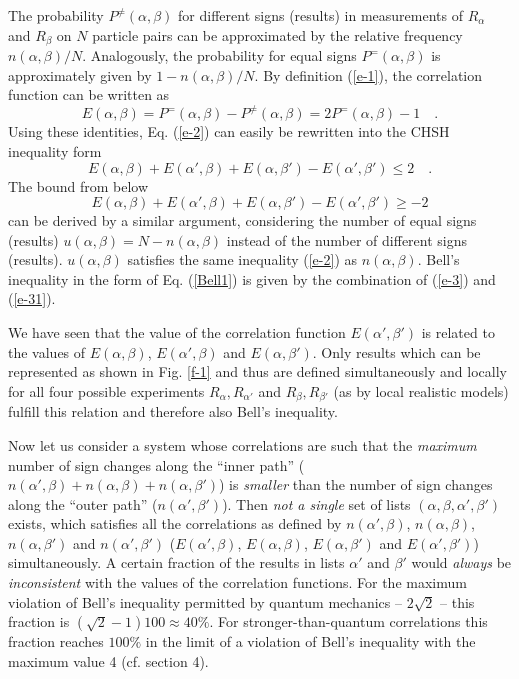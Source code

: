 The probability $P^{\neq} (\alpha , \beta )$ for different signs (results)
in measurements of $R_{\alpha}$ and $R_{\beta}$ on
$N$ particle pairs can be approximated by the relative frequency
$n(\alpha ,\beta)/N$.
Analogously, the probability for equal signs $P^=(\alpha , \beta )$
is approximately given by $1 - n(\alpha ,\beta)/N$.
By definition (\ref{e-1}), the correlation function can be written as
\begin{equation}
E(\alpha ,\beta )=
P^=(\alpha , \beta )-P^{\neq } (\alpha ,\beta )=2P^=(\alpha ,\beta
)-1 \quad.
\label{e-1a}
\end{equation}
Using these identities, Eq. (\ref{e-2}) can easily be rewritten into
the CHSH inequality \cite{chsh} form
\begin{equation}
E(\alpha ,\beta )+
E(\alpha ',\beta )+
E(\alpha ,\beta ') -
E(\alpha ',\beta ')\le 2\quad .
\label{e-3}
\end{equation}
The bound from below
\begin{equation}
E(\alpha ,\beta )+
E(\alpha ',\beta )+
E(\alpha ,\beta ') -
E(\alpha ',\beta ')\ge -2
\label{e-31}
\end{equation}
can be derived by a similar argument, considering
the number of equal signs (results) $u(\alpha ,\beta )= N-n(\alpha,\beta )$
instead of the number of different signs (results).
$u(\alpha ,\beta)$ satisfies the same inequality
(\ref{e-2}) as $n(\alpha ,\beta )$. Bell's inequality in the form of
Eq. (\ref{Bell1}) is given by the combination of (\ref{e-3}) and
(\ref{e-31}).

We have seen that the value of the correlation function
$E(\alpha ',\beta ')$ is related to the values of
$E(\alpha ,\beta )$,
$E(\alpha ',\beta )$ and
$E(\alpha ,\beta ')$.
Only results which can be represented as shown in Fig. \ref{f-1}
and thus are defined simultaneously and locally for all four
possible experiments $R_{\alpha},R_{\alpha '}$ and $R_{\beta},R_{\beta '}$
(as by local realistic models)
fulfill this relation and therefore also Bell's inequality.

Now let us consider a system whose correlations are such
that the {\em maximum} number of sign
changes along the ``inner path'' ($n(\alpha ',\beta )+
n(\alpha ,\beta )+
n(\alpha ,\beta ')$)
is {\em smaller} than the number of sign changes
along the ``outer path'' ($n(\alpha ',\beta ')$).
Then {\em not a single} set of lists
$(\alpha, \beta, \alpha ', \beta ')$ exists,
which satisfies all the correlations as defined by
$n(\alpha ',\beta)$, $n(\alpha ,\beta )$, $n(\alpha ,\beta ')$ and
$n(\alpha ',\beta ')$ ($E(\alpha ',\beta )$, $E(\alpha ,\beta )$,
$E(\alpha ,\beta ')$ and $E(\alpha ',\beta ')$) simultaneously.
A certain fraction of the results in lists
$\alpha '$ and $\beta '$ would {\em always} be {\em inconsistent}
with the values of the correlation functions.
For the maximum violation of Bell\rq s inequality
permitted by quantum mechanics -- $2\sqrt{2}$ -- this fraction is
$(\sqrt{2}-1)100 \approx 40\%$.
For stronger-than-quantum correlations this fraction reaches $100\%$
in the limit of a violation of Bell\rq s inequality with
the maximum value 4 (cf. section 4).

